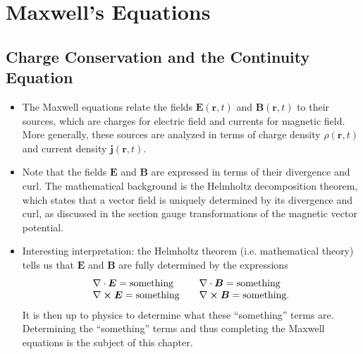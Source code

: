 \documentclass[11pt, a4paper]{article}
\renewcommand{\vec}[1]{\bm{#1}} %
\renewcommand{\r}{\vec{r}}
\newcommand{\E}{\vec{E}} %
\newcommand{\B}{\vec{B}} %
\renewcommand{\j}{\vec{j}}  %
\renewcommand{\div}{\nabla \cdot}
\renewcommand{\curl}{\nabla \cross}
\begin{document}
\newpage

\section{Maxwell's Equations}
\subsection{Charge Conservation and the Continuity Equation}

\begin{itemize}
	\item The Maxwell equations relate the fields $ \E(\r, t) $ and $ \B(\r, t) $ to their sources, which are charges for electric field and currents for magnetic field. More generally, these sources are analyzed in terms of charge density $ \rho(\r, t) $ and current density $ \j(\r, t) $.
	
	\item Note that the fields $ \E $ and $ \B $ are expressed in terms of their divergence and curl. The mathematical background is the Helmholtz decomposition theorem, which states that a vector field is uniquely determined by its divergence and curl, as discussed in the section gauge transformations of the magnetic vector potential.
	
	
	\item Interesting interpretation: the Helmholtz theorem (i.e. mathematical theory) tells us that $ \E $ and $ \B $ are fully determined by the expressions
	\[
	\begin{array}{ll}
		\div \E = \text{something} & \quad \div \B = \text{something} \\
		\curl \E = \text{something} & \quad \curl \B = \text{something}.
	\end{array}
	\]
	It is then up to physics to determine what these ``something'' terms are. Determining the ``something'' terms and thus completing the Maxwell equations is the subject of this chapter.
	
\end{itemize}
\end{document}
